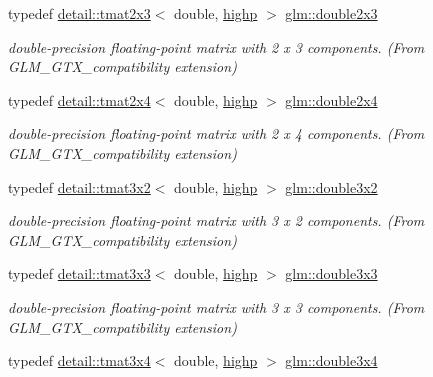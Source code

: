 \begin{DoxyCompactItemize}
typedef \hyperlink{structglm_1_1detail_1_1tmat2x3}{detail\+::tmat2x3}$<$ double, \hyperlink{namespaceglm_a0f04f086094c747d227af4425893f545ac6f7eab42eacbb10d59a58e95e362074}{highp} $>$ \hyperlink{group__gtx__compatibility_gac267cd849a60e6e96350aa5fd665d5ef}{glm\+::double2x3}
\begin{DoxyCompactList}\small\item\em double-\/precision floating-\/point matrix with 2 x 3 components. (From G\+L\+M\+\_\+\+G\+T\+X\+\_\+compatibility extension) \end{DoxyCompactList}\item 
typedef \hyperlink{structglm_1_1detail_1_1tmat2x4}{detail\+::tmat2x4}$<$ double, \hyperlink{namespaceglm_a0f04f086094c747d227af4425893f545ac6f7eab42eacbb10d59a58e95e362074}{highp} $>$ \hyperlink{group__gtx__compatibility_ga063ad3c07c7650955da6ec55819f11fe}{glm\+::double2x4}
\begin{DoxyCompactList}\small\item\em double-\/precision floating-\/point matrix with 2 x 4 components. (From G\+L\+M\+\_\+\+G\+T\+X\+\_\+compatibility extension) \end{DoxyCompactList}\item 
typedef \hyperlink{structglm_1_1detail_1_1tmat3x2}{detail\+::tmat3x2}$<$ double, \hyperlink{namespaceglm_a0f04f086094c747d227af4425893f545ac6f7eab42eacbb10d59a58e95e362074}{highp} $>$ \hyperlink{group__gtx__compatibility_ga1f70107ac850f512ac4e09737e1f85b7}{glm\+::double3x2}
\begin{DoxyCompactList}\small\item\em double-\/precision floating-\/point matrix with 3 x 2 components. (From G\+L\+M\+\_\+\+G\+T\+X\+\_\+compatibility extension) \end{DoxyCompactList}\item 
typedef \hyperlink{structglm_1_1detail_1_1tmat3x3}{detail\+::tmat3x3}$<$ double, \hyperlink{namespaceglm_a0f04f086094c747d227af4425893f545ac6f7eab42eacbb10d59a58e95e362074}{highp} $>$ \hyperlink{group__gtx__compatibility_ga2b56fa7536ae728c64fde99d6618139a}{glm\+::double3x3}
\begin{DoxyCompactList}\small\item\em double-\/precision floating-\/point matrix with 3 x 3 components. (From G\+L\+M\+\_\+\+G\+T\+X\+\_\+compatibility extension) \end{DoxyCompactList}\item 
typedef \hyperlink{structglm_1_1detail_1_1tmat3x4}{detail\+::tmat3x4}$<$ double, \hyperlink{namespaceglm_a0f04f086094c747d227af4425893f545ac6f7eab42eacbb10d59a58e95e362074}{highp} $>$ \hyperlink{group__gtx__compatibility_gab38107892c0116610e7de83126aff405}{glm\+::double3x4}

\end{DoxyCompactItemize}
